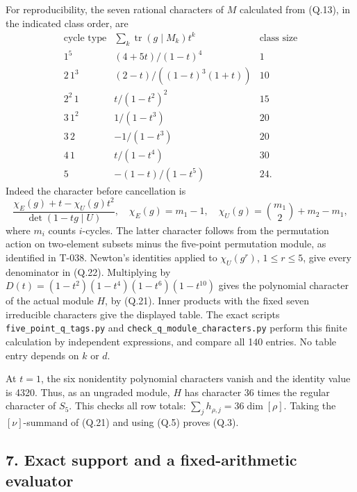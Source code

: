 \documentclass[
  10pt,
]{article}
\begin{document}
For reproducibility, the seven rational characters of \(M\) calculated
from (Q.13), in the indicated class order, are \[
\begin{array}{c|c|r}
\text{cycle type}&\sum_k\operatorname{tr}(g\mid M_k)t^k&\text{class size}\\\hline
1^5&(4+5t)/(1-t)^4&1\\
2\,1^3&(2-t)/((1-t)^3(1+t))&10\\
2^2\,1&t/(1-t^2)^2&15\\
3\,1^2&1/(1-t^3)&20\\
3\,2&-1/(1-t^3)&20\\
4\,1&t/(1-t^4)&30\\
5&-(1-t)/(1-t^5)&24.
\end{array}
\tag{Q.22}
\] Indeed the character before cancellation is \[
\frac{\chi_E(g)+t-\chi_U(g)t^2}{\det(1-tg\mid U)},
\quad \chi_E(g)=m_1-1,\quad
\chi_U(g)=\binom{m_1}{2}+m_2-m_1,
\tag{Q.23}
\] where \(m_i\) counts \(i\)-cycles. The latter character follows from
the permutation action on two-element subsets minus the five-point
permutation module, as identified in T-038. Newton's identities applied
to \(\chi_U(g^r)\), \(1\le r\le5\), give every denominator in (Q.22).
Multiplying by \(D(t)=(1-t^2)(1-t^4)(1-t^6)(1-t^{10})\) gives the
polynomial character of the actual module \(H\), by (Q.21). Inner
products with the fixed seven irreducible characters give the displayed
table. The exact scripts
\texttt{\small five\_\allowbreak{}point\_\allowbreak{}q\_\allowbreak{}tags.py}
and
\texttt{\small check\_\allowbreak{}q\_\allowbreak{}module\_\allowbreak{}characters.py}
perform this finite calculation by independent expressions, and compare
all 140 entries. No table entry depends on \(k\) or \(d\).

At \(t=1\), the six nonidentity polynomial characters vanish and the
identity value is 4320. Thus, as an ungraded module, \(H\) has character
\(36\) times the regular character of \(S_5\). This checks all row
totals: \(\sum_jh_{\rho,j}=36\dim[\rho]\). Taking the \([\nu]\)-summand
of (Q.21) and using (Q.5) proves (Q.3).

\subsection{7. Exact support and a fixed-arithmetic
evaluator}\label{exact-support-and-a-fixed-arithmetic-evaluator}
\end{document}

